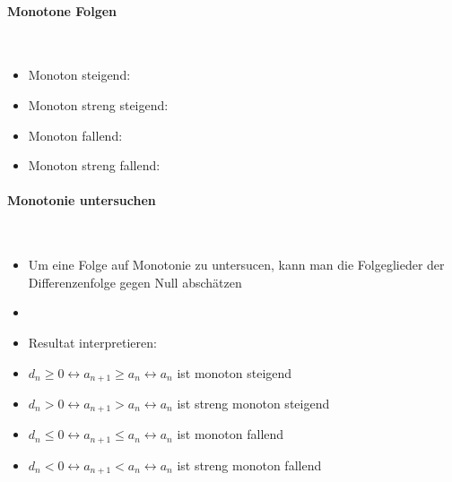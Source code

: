 \paragraph{Monotone Folgen}\mbox{}\\
\begin{itemize}
    \item Monoton steigend: 
    \item Monoton streng steigend: 
    \item Monoton fallend: 
    \item Monoton streng fallend: 
\end{itemize}
\vspace{1mm}

\paragraph{Monotonie untersuchen}\mbox{}\\
\begin{itemize}
    \item Um eine Folge auf Monotonie zu untersucen, kann man die Folgeglieder der Differenzenfolge gegen Null abschätzen
    \item {}
    \item Resultat interpretieren:
    \item $d_n \geq 0 \leftrightarrow a_{n+1} \geq a_n \leftrightarrow a_n$ ist monoton steigend
    \item $d_n > 0 \leftrightarrow a_{n+1} > a_n \leftrightarrow a_n$ ist streng monoton steigend
    \item $d_n \leq 0 \leftrightarrow a_{n+1} \leq a_n \leftrightarrow a_n$ ist monoton fallend
    \item $d_n < 0 \leftrightarrow a_{n+1} < a_n \leftrightarrow a_n$ ist streng monoton fallend
\end{itemize}
\vspace{1mm}

